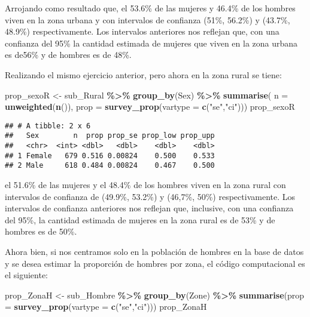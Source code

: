 \documentclass[
  12pt,
]{book}
\newenvironment{Shaded}{\begin{snugshade}}{\end{snugshade}}
\newcommand{\AttributeTok}[1]{\textcolor[rgb]{0.13,0.29,0.53}{#1}}
\newcommand{\FunctionTok}[1]{\textcolor[rgb]{0.13,0.29,0.53}{\textbf{#1}}}
\newcommand{\NormalTok}[1]{#1}
\newcommand{\OtherTok}[1]{\textcolor[rgb]{0.56,0.35,0.01}{#1}}
\newcommand{\SpecialCharTok}[1]{\textcolor[rgb]{0.81,0.36,0.00}{\textbf{#1}}}
\newcommand{\StringTok}[1]{\textcolor[rgb]{0.31,0.60,0.02}{#1}}
\begin{document}
Arrojando como resultado que, el 53.6\% de las mujeres y 46.4\% de los hombres viven en la zona urbana y con intervalos de confianza (51\%, 56.2\%) y (43.7\%, 48.9\%) respectivamente. Los intervalos anteriores nos reflejan que, con una confianza del 95\% la cantidad estimada de mujeres que viven en la zona urbana es de56\% y de hombres es de 48\%.

Realizando el mismo ejercicio anterior, pero ahora en la zona rural se tiene:

\begin{Shaded}
\begin{Highlighting}[]
\NormalTok{prop\_sexoR }\OtherTok{\textless{}{-}}\NormalTok{ sub\_Rural }\SpecialCharTok{\%\textgreater{}\%} \FunctionTok{group\_by}\NormalTok{(Sex) }\SpecialCharTok{\%\textgreater{}\%} 
              \FunctionTok{summarise}\NormalTok{( }\AttributeTok{n =} \FunctionTok{unweighted}\NormalTok{(}\FunctionTok{n}\NormalTok{()),}
                         \AttributeTok{prop =} \FunctionTok{survey\_prop}\NormalTok{(}\AttributeTok{vartype =} \FunctionTok{c}\NormalTok{(}\StringTok{"se"}\NormalTok{,}\StringTok{"ci"}\NormalTok{)))}
\NormalTok{prop\_sexoR}
\end{Highlighting}
\end{Shaded}

\begin{verbatim}
## # A tibble: 2 x 6
##   Sex        n  prop prop_se prop_low prop_upp
##   <chr>  <int> <dbl>   <dbl>    <dbl>    <dbl>
## 1 Female   679 0.516 0.00824    0.500    0.533
## 2 Male     618 0.484 0.00824    0.467    0.500
\end{verbatim}

el 51.6\% de las mujeres y el 48.4\% de los hombres viven en la zona rural con intervalos de confianza de (49.9\%, 53.2\%) y (46,7\%, 50\%) respectivamente. Los intervalos de confianza anteriores nos reflejan que, inclusive, con una confianza del 95\%, la cantidad estimada de mujeres en la zona rural es de 53\% y de hombres es de 50\%.

Ahora bien, si nos centramos solo en la población de hombres en la base de datos y se desea estimar la proporción de hombres por zona, el código computacional es el siguiente:

\begin{Shaded}
\begin{Highlighting}[]
\NormalTok{prop\_ZonaH }\OtherTok{\textless{}{-}}\NormalTok{ sub\_Hombre }\SpecialCharTok{\%\textgreater{}\%} \FunctionTok{group\_by}\NormalTok{(Zone) }\SpecialCharTok{\%\textgreater{}\%} 
              \FunctionTok{summarise}\NormalTok{(}\AttributeTok{prop =} \FunctionTok{survey\_prop}\NormalTok{(}\AttributeTok{vartype =} \FunctionTok{c}\NormalTok{(}\StringTok{"se"}\NormalTok{,}\StringTok{"ci"}\NormalTok{)))}
\NormalTok{prop\_ZonaH}
\end{Highlighting}
\end{Shaded}
\end{document}
